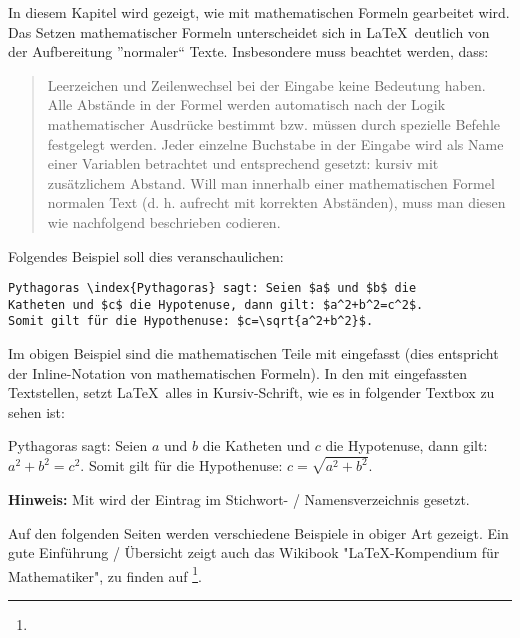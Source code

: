 In diesem Kapitel wird gezeigt, wie mit mathematischen Formeln  gearbeitet wird. Das Setzen mathematischer Formeln unterscheidet sich in \LaTeX\ deutlich von der Aufbereitung ”normaler“ Texte. Insbesondere muss beachtet werden, dass:

\begin{quote}
Leerzeichen und Zeilenwechsel bei der Eingabe keine Bedeutung haben. Alle Abstände in der Formel werden automatisch nach der Logik mathematischer Ausdrücke bestimmt bzw. müssen durch spezielle Befehle festgelegt werden. Jeder einzelne Buchstabe in der Eingabe wird als Name einer Variablen betrachtet und entsprechend gesetzt: kursiv mit zusätzlichem Abstand. Will man innerhalb einer mathematischen Formel normalen Text (d. h. aufrecht mit korrekten Abständen), muss man diesen wie nachfolgend beschrieben codieren.
\end{quote}

\par\bigskip 
\par\bigskip 
Folgendes Beispiel soll dies veranschaulichen:

\begin{tcolorbox}[width=\textwidth,colback={light-gray},title={Latex-Text},colbacktitle=gray,coltitle=white]

\begin{verbatim}
Pythagoras \index{Pythagoras} sagt: Seien $a$ und $b$ die 
Katheten und $c$ die Hypotenuse, dann gilt: $a^2+b^2=c^2$. 
Somit gilt für die Hypothenuse: $c=\sqrt{a^2+b^2}$.
\end{verbatim}

\end{tcolorbox}

Im obigen Beispiel sind die mathematischen Teile mit \code{\$} eingefasst (dies entspricht der Inline-Notation von mathematischen Formeln). In den mit \code{\$} eingefassten Textstellen, setzt \LaTeX\ alles in Kursiv-Schrift, wie es in folgender Textbox zu sehen ist: 

\begin{tcolorbox}[width=\textwidth,colback={light-gray},title={Print-Text},colbacktitle=gray,coltitle=white]

Pythagoras  sagt: Seien $a$ und $b$ die 
Katheten und $c$ die Hypotenuse, dann gilt: $a^2+b^2=c^2$. 
Somit gilt für die Hypothenuse: $c=\sqrt{a^2+b^2}$.

\end{tcolorbox}

\textbf{Hinweis:} Mit  wird der Eintrag im Stichwort- / Namensverzeichnis gesetzt.

\par\bigskip 
\par\bigskip 
Auf den folgenden Seiten werden verschiedene Beispiele in obiger Art gezeigt. Ein gute Einführung / Übersicht zeigt auch das Wikibook "LaTeX-Kompendium für Mathematiker", zu finden auf \footnote{\Kompendium}.

